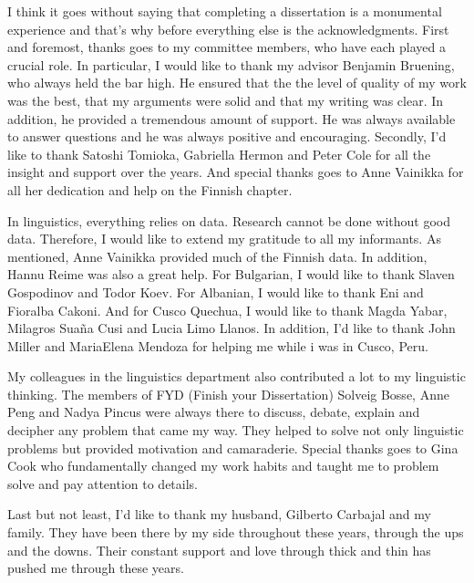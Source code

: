 \begin{front} %


\figurespagefalse %
                   \tablespagefalse  %

\maketocloflot



I think it goes without saying that completing a dissertation is a monumental experience and that's why before everything else is the acknowledgments.   First and foremost, thanks goes to my committee members, who have each played a crucial role.  In particular, I would like to thank my advisor Benjamin Bruening, who always held the bar high.  He ensured that the the level of quality of my work was the best, that my arguments were solid and that my writing was clear.  In addition, he provided a tremendous amount of support.  He was always available to answer questions and he was always positive and encouraging.  Secondly, I'd like to thank Satoshi Tomioka, Gabriella Hermon and Peter Cole for all the insight and support over the years.  And special thanks goes to Anne Vainikka for all her dedication and help on the Finnish chapter.  

In linguistics, everything relies on data.  Research cannot be done without good data.  Therefore, I would like to extend my gratitude to all my informants. As mentioned, Anne Vainikka provided much of the Finnish data.  In addition, Hannu Reime was also a great help.  For Bulgarian,  I would like to thank Slaven Gospodinov and Todor Koev.  For Albanian, I would like to thank Eni and Fioralba Cakoni.   And for Cusco Quechua, I would like to thank Magda Yabar, Milagros Sua\~na Cusi and Lucia Limo Llanos.   In addition, I'd like to thank John Miller and MariaElena Mendoza for helping me while i was in Cusco, Peru.


My colleagues in the linguistics department also contributed a lot to my linguistic thinking.  The members of FYD (Finish your Dissertation) Solveig Bosse, Anne Peng and Nadya Pincus were always there to discuss, debate, explain and decipher any problem that came my way.  They helped to solve not only linguistic problems but provided motivation and camaraderie.   Special thanks goes to Gina Cook who fundamentally changed my work habits and taught me to problem solve and pay attention to details.  

Last but not least, I'd like to thank my husband, Gilberto Carbajal and my family. They have been there by my side throughout these years, through the ups and the downs.   Their constant support and love through thick and thin has pushed me through these years.   










\end{front}
